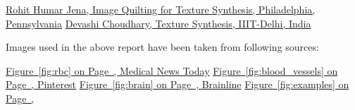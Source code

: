 \documentclass[12pt,a4paper]{report}
\begin{document}
\begin{enumerate}
  
   \href{https://github.com/rohitrango/Image-Quilting-for-Texture-Synthesis}{Rohit Humar Jena, Image Quilting for Texture Synthesis, Philadelphia, Pennsylvania}
   \href{https://github.com/Devashi-Choudhary/Texture-Synthesis}{Devashi Choudhary, Texture Synthesis, IIIT-Delhi, India}
\end{enumerate}
{\large Images used in the above report have been taken from following sources:}
\begin{enumerate}
   \href{https://www.medicalnewstoday.com/articles/red-blood-cell-disorders-types-causes-and-symptoms}{Figure~\ref{fig:rbc} on Page~\pageref{fig:rbc},  Medical News Today}
   \href{https://www.pinterest.com/pin/0x7-medical--524317581592002674/}{Figure~\ref{fig:blood_vessels} on Page~\pageref{fig:blood_vessels},  Pinterest}
   \href{https://www.brainline.org/tbi-basics/interactive-brain}{Figure~\ref{fig:brain} on Page~\pageref{fig:brain}, Brainline}
   \href{https://arxiv.org/pdf/1706.02823v3.pdf}{Figure~\ref{fig:examples} on Page~\pageref{fig:examples}, \cite[TextureGAN]{b2}}
\end{enumerate}
\end{document}
